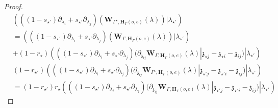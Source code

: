 \documentclass[11pt]{amsart}
\theoremstyle{definition}
\theoremstyle{remark}
\numberwithin{equation}{section}
\begin{document}
\begin{proof}
$$$$
\begin{align*}
   & \left(((1-s_{\star'})\partial_{\lambda_i}+s_{\star'}\partial_{\lambda_j})(\mathbf{W}_{\Gamma^{\star},\mathbf{H}_{\Gamma}(o,e)}(\lambda))|\lambda_{\star'}\right) \\
   & =   \left(((1-s_{\star'})\partial_{\lambda_i}+s_{\star'}\partial_{\lambda_j})(\mathbf{W}_{\Gamma,\mathbf{H}_{\Gamma}(o,e)}(\lambda))|\lambda_{\star'}\right)\\
   &+(1-r_{\star})\left(((1-s_{\star'})\partial_{\lambda_i}+s_{\star'}\partial_{\lambda_j})(\partial_{\mathfrak{z}_{ij}}\mathbf{W}_{\Gamma,\mathbf{H}_{\Gamma}(o,e)}(\lambda)|\mathfrak{z}_{\star j}-\mathfrak{z}_{\star i}-\mathfrak{z}_{ij})|\lambda_{\star'}\right)
\end{align*}
\begin{align*}
   & (1-r_{\star'})   \left(((1-s_{\star'})\partial_{\lambda_i}+s_{\star'}\partial_{\lambda_j})(\partial_{\mathfrak{z}_{ij}}\mathbf{W}_{\Gamma^{\star},\mathbf{H}_{\Gamma}(o,e)}(\lambda)|\mathfrak{z}_{\star' j}-\mathfrak{z}_{\star' i}-\mathfrak{z}_{ij})|\lambda_{\star'}\right) \\
   &=  (1-r_{\star'})   r_{\star} \left(((1-s_{\star'})\partial_{\lambda_i}+s_{\star'}\partial_{\lambda_j})(\partial_{\mathfrak{z}_{ij}}\mathbf{W}_{\Gamma,\mathbf{H}_{\Gamma}(o,e)}(\lambda)|\mathfrak{z}_{\star' j}-\mathfrak{z}_{\star' i}-\mathfrak{z}_{ij})|\lambda_{\star'}\right)
\end{align*}

\fi


\end{proof}
\end{document}

